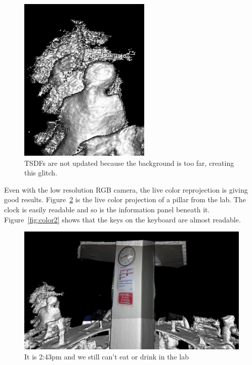 \documentclass[12pt]{article}
\begin{document}
\begin{figure}[!h]
  \centering
  \includegraphics[scale=0.5]{glitch3.png}
  \caption{\label{fig:glitch3} TSDFs are not updated because the background is too far, creating this glitch.}
\end{figure}

Even with the low resolution RGB camera, the live color reprojection is giving good results. Figure~\ref{fig:color1} is the live color projection of a pillar from the lab. The clock is easily readable and so is the information panel beneath it. Figure~\ref{fig:color2} shows that the keys on the keyboard are almost readable.

\begin{figure}[!h]
  \centering
  \includegraphics[scale=0.33]{Color1.png}
  \caption{\label{fig:color1} It is 2:43pm and we still can't eat or drink in the lab}
\end{figure}
\end{document}
